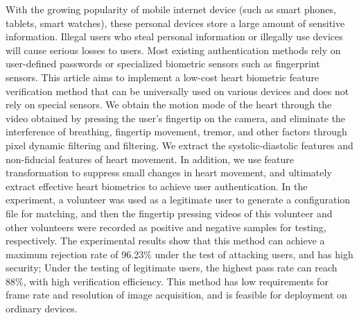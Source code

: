 \begin{abstractEn}
{With the growing popularity of mobile internet device (such as smart phones, tablets, smart watches), these personal devices store a large amount of sensitive information. Illegal users who steal personal information or illegally use devices will cause serious losses to users. Most existing authentication methods rely on user-defined passwords or specialized biometric sensors such as fingerprint sensors. This article aims to implement a low-cost heart biometric feature verification method that can be universally used on various devices and does not rely on special sensors. We obtain the motion mode of the heart through the video obtained by pressing the user's fingertip on the camera, and eliminate the interference of breathing, fingertip movement, tremor, and other factors through pixel dynamic filtering and filtering. We extract the systolic-diastolic features and non-fiducial features of heart movement. In addition, we use feature transformation to suppress small changes in heart movement, and ultimately extract effective heart biometrics to achieve user authentication. In the experiment, a volunteer was used as a legitimate user to generate a configuration file for matching, and then the fingertip pressing videos of this volunteer and other volunteers were recorded as positive and negative samples for testing, respectively. The experimental results show that this method can achieve a maximum rejection rate of 96.23\% under the test of attacking users, and has high security; Under the testing of legitimate users, the highest pass rate can reach 88\%, with high verification efficiency. This method has low requirements for frame rate and resolution of image acquisition, and is feasible for deployment on ordinary devices.}

\end{abstractEn}
